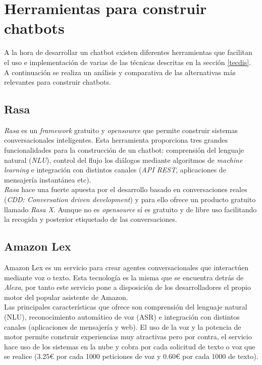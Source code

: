 \section{Herramientas para construir chatbots} \label{herramientas construir chatbots}
A la hora de desarrollar un chatbot existen diferentes herramientas que facilitan el uso e implementación de varias de las técnicas descritas en la sección \ref{tecdis}. A continuación se realiza un análisis y comparativa de las alternativas más relevantes para construir chatbots.\\

\subsection{Rasa}
\textit{Rasa} \cite{rasa} es un \textit{framework} gratuito y \textit{opensource} que permite construir sistemas conversacionales inteligentes. Esta herramienta proporciona tres grandes funcionalidades para la construcción de un chatbot: comprensión del lenguaje natural (\textit{NLU}), control del flujo los diálogos mediante algoritmos de \textit{machine learning} e integración con distintos canales (\textit{API REST}, aplicaciones de mensajería instantánea etc).\\

\textit{Rasa} hace una fuerte apuesta por el desarrollo basado en conversaciones reales (\textit{CDD: Conversation driven development}) y para ello ofrece un producto gratuito llamado \textit{Rasa X}. Aunque no es \textit{opensource} sí es gratuito y de libre uso facilitando la recogida y posterior etiquetado de las conversaciones.\\

\subsection{Amazon Lex}
Amazon Lex \cite{amazonlex} es un servicio para crear agentes conversacionales que interactúen mediante voz o texto. Esta tecnología es la misma que se encuentra detrás de \textit{Alexa}, por tanto este servicio pone a disposición de los desarrolladores el propio motor del popular asistente de Amazon.\\

Las principales características que ofrece son comprensión del lenguaje natural (NLU), reconocimiento automático de voz (ASR) e integración con distintos canales (aplicaciones de mensajería y web). El uso de la voz y la potencia de motor permite construir experiencias muy atractivas pero por contra, el servicio hace uso de los sistemas en la nube y cobra por cada solicitud de texto o voz que se realice (3.25\euro{} por cada 1000 peticiones de voz y 0.60\euro{} por cada 1000 de texto). \\


